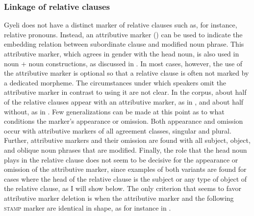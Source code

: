 









\subsubsection{Linkage of relative clauses}
\label{sec:RELlink} 

Gyeli does not have a distinct marker of relative clauses such as, for instance, relative pronouns. Instead, an attributive marker ({\ATT}) can be used to indicate the embedding relation between subordinate clause and modified noun phrase. This attributive marker, which agrees in gender with the head noun, is also used in noun + noun constructions, as discussed in . In most cases, however, the use of the attributive marker is optional so that a relative clause is often not marked by a dedicated morpheme. The circumstances under which speakers omit the attributive marker in contrast to using it are not clear. In the corpus, about half of the relative clauses appear with an attributive marker, as in , and about half without, as in . Few generalizations can be made at this point as to what conditions the marker's appearance or omission. Both appearance and omission occur with attributive markers of all agreement classes, singular and plural. Further, attributive markers and their omission are found with all subject, object, and oblique noun phrases that are  modified. Finally, the role that the head noun plays in the relative clause does not seem to be decisive for the appearance or omission of the attributive marker, since examples of both variants are found for cases where the head of the relative clause is the subject or any type of object of the relative clause, as I will show below.  The only criterion that seems to favor attributive marker deletion is when the attributive marker and the following \textsc{stamp} marker are identical in shape, as for instance in .

